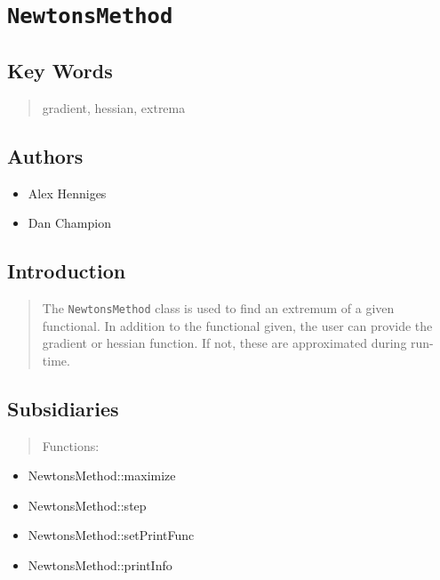 \documentclass[10pt]{article}%
\begin{document}

\section*{\texttt{NewtonsMethod}}

\label{f0}
\subsection*{Key Words}

\begin{quotation} gradient, hessian, extrema\end{quotation}

\subsection*{Authors}

\begin{itemize}\item  Alex Henniges
\item  Dan Champion  
\end{itemize}
\begin{quotation} \end{quotation}
\subsection*{Introduction}

\begin{quotation} The \texttt{NewtonsMethod} class is used to find an extremum of a given functional. In addition to the functional given, the user can provide the gradient or hessian function. If not, these are approximated during run-time.\end{quotation}

\subsection*{Subsidiaries}

\begin{quotation} Functions:\end{quotation}
\begin{itemize}
\item  NewtonsMethod::maximize
\item  NewtonsMethod::step
\item  NewtonsMethod::setPrintFunc
\item  NewtonsMethod::printInfo
\end{itemize}
\begin{quotation} \end{quotation}
\end{document}
